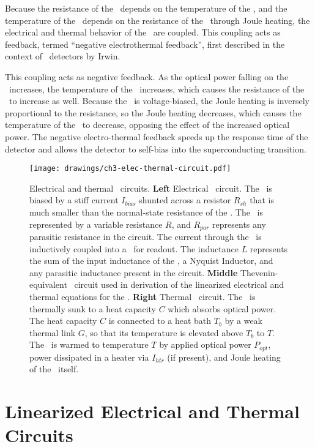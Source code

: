 Because the resistance of the \TES\ depends on the temperature of the \TES, and the temperature of the \TES\ depends on the resistance of the \TES\ through Joule heating, the electrical and thermal behavior of the \TES\ are coupled.
This coupling acts as feedback, termed ``negative electrothermal feedback'', first described in the context of \TES\ detectors by Irwin\cite{irwin_application_1995}.

This coupling acts as negative feedback.
As the optical power falling on the \TES\ increases, the temperature of the \TES\ increases, which causes the resistance of the \TES\ to increase as well.
Because the \TES\ is voltage-biased, the Joule heating is inversely proportional to the resistance, so the Joule heating decreases, which causes the temperature of the \TES\ to decrease, opposing the effect of the increased optical power.
The negative electro-thermal feedback speeds up the response time of the detector and allows the detector to self-bias into the superconducting transition.

\begin{figure*}
\centering
\texttt{[image: drawings/ch3-elec-thermal-circuit.pdf]}
\caption{Electrical and thermal \TES\ circuits.
\textbf{Left} Electrical \TES\ circuit.
The \TES\ is biased by a stiff current $I_{bias}$ shunted across a resistor $R_{sh}$ that is much smaller than the normal-state resistance of the \TES.
The \TES\ is represented by a variable resistance $R$, and $R_{par}$ represents any parasitic resistance in the circuit.
The current through the \TES\ is inductively coupled into a \SQUID\ for readout.
The inductance $L$ represents the sum of the input inductance of the \SQUID, a Nyquist Inductor, and any parasitic inductance present in the circuit.
\textbf{Middle} Thevenin-equivalent \TES\ circuit used in derivation of the linearized electrical and thermal equations for the \TES.
\textbf{Right} Thermal \TES\ circuit. The \TES\ is thermally sunk to a heat capacity $C$ which absorbs optical power. The heat capacity $C$ is connected to a heat bath $T_b$ by a weak thermal link $G$, so that its temperature is elevated above $T_b$ to $T$.
The \TES\ is warmed to temperature $T$ by applied optical power $P_{opt}$, power dissipated in a heater via $I_{htr}$ (if present), and Joule heating of the \TES\ itself.}
\label{fig:elec-thermal-circuit}
\end{figure*}

\section{Linearized Electrical and Thermal Circuits}


